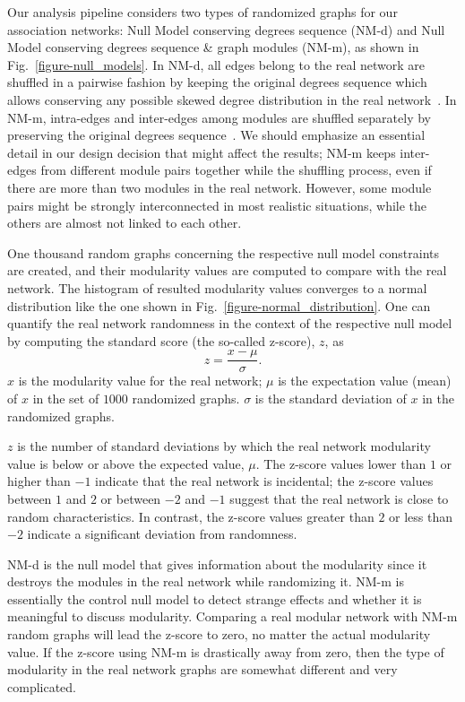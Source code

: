 Our analysis pipeline considers two types of randomized graphs for our association networks: Null Model conserving degrees sequence (NM-d) and Null Model conserving degrees sequence \& graph modules (NM-m), as shown in Fig.~\ref{figure-null_models}. In NM-d, all edges belong to the real network are shuffled in a pairwise fashion by keeping the original degrees sequence which allows conserving any possible skewed degree distribution in the real network~\cite{FORTUNATO201075, Fretter2012}. In NM-m, intra-edges and inter-edges among modules are shuffled separately by preserving the original degrees sequence~\cite{Fretter2012}. We should emphasize an essential detail in our design decision that might affect the results; NM-m keeps inter-edges from different module pairs together while the shuffling process, even if there are more than two modules in the real network. However, some module pairs might be strongly interconnected in most realistic situations, while the others are almost not linked to each other.


One thousand random graphs concerning the respective null model constraints are created, and their modularity values are computed to compare with the real network. The histogram of resulted modularity values converges to a normal distribution like the one shown in Fig.~\ref{figure-normal_distribution}. One can quantify the real network randomness in the context of the respective null model by computing the standard score (the so-called z-score), $z$, as
\begin{equation} %
	z = \frac{x-\mu}{\sigma}.
	\label{zscore}
\end{equation} 
$x$ is the modularity value for the real network; $\mu$ is the expectation value (mean) of $x$ in the set of $1000$ randomized graphs. $\sigma$ is the standard deviation of $x$ in the randomized graphs. 

$z$ is the number of standard deviations by which the real network modularity value is below or above the expected value, $\mu$. The z-score values lower than $1$ or higher than $-1$ indicate that the real network is incidental; the z-score values between $1$ and $2$ or between $-2$ and $-1$ suggest that the real network is close to random characteristics. In contrast, the z-score values greater than $2$ or less than $-2$ indicate a significant deviation from randomness.

NM-d is the null model that gives information about the modularity since it destroys the modules in the real network while randomizing it. NM-m is essentially the control null model to detect strange effects and whether it is meaningful to discuss modularity. Comparing a real modular network with NM-m random graphs will lead the z-score to zero, no matter the actual modularity value. If the z-score using NM-m is drastically away from zero, then the type of modularity in the real network graphs are somewhat different and very complicated. 

